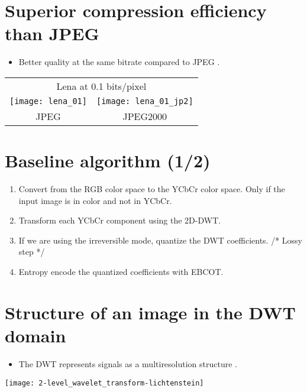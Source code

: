 \section{Superior compression efficiency than \gls{JPEG}}
\begin{itemize}
\item Better quality at the same bitrate compared to JPEG \cite{vruiz_J2K}.
\end{itemize}
\begin{center}
  \begin{tabular}{cc}
    \multicolumn{2}{c}{Lena at 0.1 bits/pixel} \\
    \texttt{[image: lena\_01]} & \texttt{[image: lena\_01\_jp2]} \\
    JPEG & JPEG2000
  \end{tabular}
\end{center}

\section{Baseline algorithm (1/2)}
\begin{enumerate}
\item Convert from the \gls{RGB} color space to the \gls{YCbCr} color
  space. Only if the input image is in color and not in \gls{YCbCr}.
\item Transform each \gls{YCbCr} component using the 2D-\gls{DWT}.
\item If we are using the irreversible mode, quantize the \gls{DWT}
  coefficients. /* Lossy step */
\item Entropy encode the quantized coefficients with \gls{EBCOT}.
\end{enumerate}

\section{Structure of an image in the DWT domain}
\begin{itemize}
\item The \gls{DWT} represents signals as a multiresolution structure
  \cite{vruiz_J2K}.
\end{itemize}
\vspace{-2ex}
\begin{center}
  \texttt{[image: 2-level\_wavelet\_transform-lichtenstein]}
\end{center}

